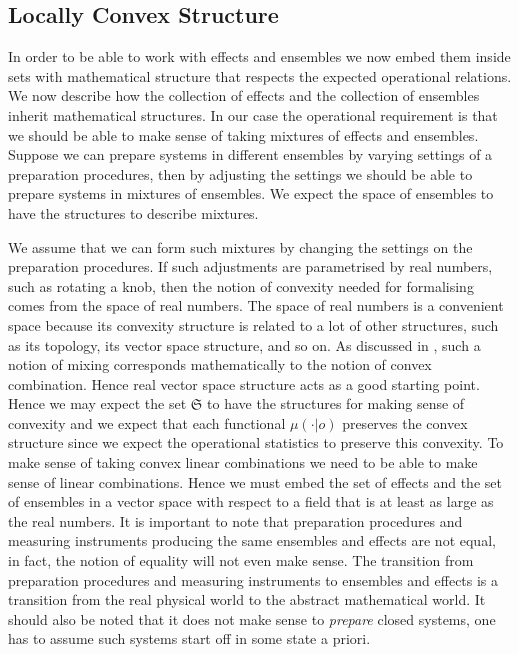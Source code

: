 \documentclass[11pt]{article}
\begin{document}
\subsection*{Locally Convex Structure}\label{LocallyConvex}
In order to be able to work with effects and ensembles we now embed them inside sets with mathematical structure that respects the expected operational relations. We now describe how the collection of effects and the collection of ensembles inherit mathematical structures. In our case the operational requirement is that we should be able to make sense of taking mixtures of effects and ensembles. Suppose we can prepare systems in different ensembles by varying settings of a preparation procedures, then by adjusting the settings we should be able to prepare systems in mixtures of ensembles. We expect the space of ensembles to have the structures to describe mixtures. 

We assume that we can form such mixtures by changing the settings on the preparation procedures. If such adjustments are parametrised by real numbers, such as rotating a knob, then the notion of convexity needed for formalising comes from the space of real numbers. The space of real numbers is a convenient space because its convexity structure is related to a lot of other structures, such as its topology, its vector space structure, and so on. As discussed in \cite{Gudder}, such a notion of mixing corresponds mathematically to the notion of convex combination. Hence real vector space structure acts as a good starting point. Hence we may expect the set $\mathfrak{S}$ to have the structures for making sense of convexity and we expect that each functional $\mu(\cdot|o)$ preserves the convex structure since we expect the operational statistics to preserve this convexity. To make sense of taking convex linear combinations we need to be able to make sense of linear combinations. Hence we must embed the set of effects and the set of ensembles in a vector space with respect to a field that is at least as large as the real numbers. It is important to note that preparation procedures and measuring instruments producing the same ensembles and effects are not equal, in fact, the notion of equality will not even make sense. The transition from preparation procedures and measuring instruments to ensembles and effects is a transition from the real physical world to the abstract mathematical world. It should also be noted that it does not make sense to \emph{prepare} closed systems, one has to assume such systems start off in some state a priori.
\end{document}
